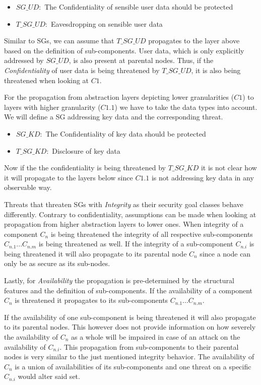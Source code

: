 \begin{itemize}
\item[]\textbf{$SG\_UD:$} The Confidentiality of sensible user data should be protected
\item[]\textbf{$T\_SG\_UD:$} Eavesdropping on sensible user data
\end{itemize}

Similar to SGs, we can assume that $T\_SG\_UD$ propagates to the layer above based on the definition of sub-components. User data, which is only explicitly addressed by $SG\_UD$, is also present at parental nodes. Thus, if the \textit{Confidentiality} of user data is being threatened by $T\_SG\_UD$, it is also being threatened when looking at $C1$.

For the propagation from abstraction layers depicting lower granularities ($C1$) to layers with higher granularity ($C1.1$) we have to take the data types into account. We will define a SG addressing key data and the corresponding threat.

\begin{itemize}
\item[]\textbf{$SG\_KD:$} The Confidentiality of key data should be protected
\item[]\textbf{$T\_SG\_KD:$} Disclosure of key data
\end{itemize}

Now if the the confidentiality is being threatened by $T\_SG\_KD$ it is not clear how it will propagate to the layers below since $C1.1$ is not addressing key data in any observable way. 

Threats that threaten SGs with \textit{Integrity} as their security goal classes behave differently. Contrary to confidentiality, assumptions can be made when looking at propagation from higher abstraction layers to lower ones. When integrity of a component $C_n$ is being threatened the integrity of all respective sub-components $C_{n.1} ... C_{n.m}$ is being threatened as well. If the integrity of a sub-component $C_{n.i}$ is being threatened it will also propagate to its parental node $C_n$ since a node can only be as secure as its sub-nodes.

Lastly, for \textit{Availability} the propagation is pre-determined by the structural features and the definition of sub-components. If the availability of a component $C_n$ is threatened it propagates to its sub-components $C_{n.1} ... C_{n.m}$. 

If the availability of one sub-component is being threatened it will also propagate to its parental nodes. This however does not provide information on how severely the availability of $C_n$ as a whole will be impaired in case of an attack on the availability of $C_{n.i}$. This propagation from sub-components to their parental nodes is very similar to the just mentioned integrity behavior. The availability of $C_n$ is a union of availabilities of its sub-components and one threat on a specific $C_{n.i}$ would alter said set.

